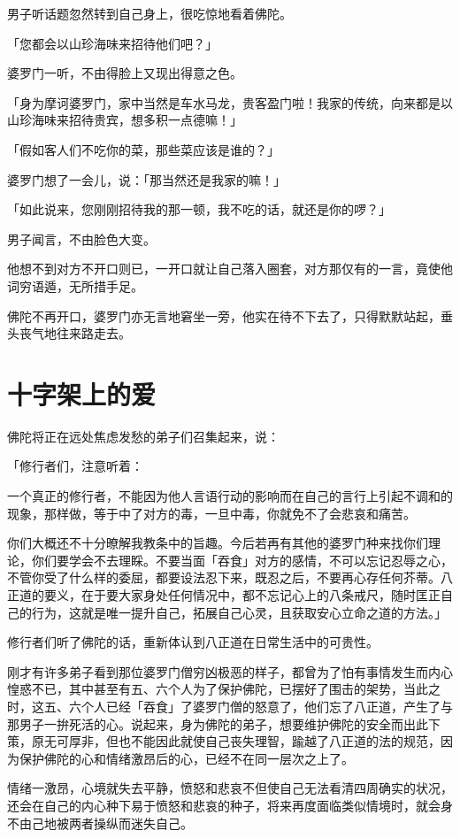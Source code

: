 \documentclass[12pt,twoside,openany]{book}
\begin{document}
男子听话题忽然转到自己身上，很吃惊地看着佛陀。

「您都会以山珍海味来招待他们吧？」

婆罗门一听，不由得脸上又现出得意之色。

「身为摩诃婆罗门，家中当然是车水马龙，贵客盈门啦！我家的传统，向来都是以山珍海味来招待贵宾，想多积一点德嘛！」

「假如客人们不吃你的菜，那些菜应该是谁的？」

婆罗门想了一会儿，说：「那当然还是我家的嘛！」

「如此说来，您刚刚招待我的那一顿，我不吃的话，就还是你的啰？」

男子闻言，不由脸色大变。

他想不到对方不开口则已，一开口就让自己落入圈套，对方那仅有的一言，竟使他词穷语遁，无所措手足。

佛陀不再开口，婆罗门亦无言地窘坐一旁，他实在待不下去了，只得默默站起，垂头丧气地往来路走去。

\section{十字架上的爱}\label{sec3.10}

佛陀将正在远处焦虑发愁的弟子们召集起来，说：

「修行者们，注意听着：

一个真正的修行者，不能因为他人言语行动的影响而在自己的言行上引起不调和的现象，那样做，等于中了对方的毒，一旦中毒，你就免不了会悲哀和痛苦。

你们大概还不十分暸解我教条中的旨趣。今后若再有其他的婆罗门种来找你们理论，你们要学会不去理睬。不要当面「吞食」对方的感情，不可以忘记忍辱之心，不管你受了什么样的委屈，都要设法忍下来，既忍之后，不要再心存任何芥蒂。八正道的要义，在于要大家身处任何情况中，都不忘记心上的八条戒尺，随时匡正自己的行为，这就是唯一提升自己，拓展自己心灵，且获取安心立命之道的方法。」

修行者们听了佛陀的话，重新体认到八正道在日常生活中的可贵性。

刚才有许多弟子看到那位婆罗门僧穷凶极恶的样子，都曾为了怕有事情发生而内心惶惑不已，其中甚至有五、六个人为了保护佛陀，已摆好了围击的架势，当此之时，这五、六个人已经「吞食」了婆罗门僧的怒意了，他们忘了八正道，产生了与那男子一拚死活的心。说起来，身为佛陀的弟子，想要维护佛陀的安全而出此下策，原无可厚非，但也不能因此就使自己丧失理智，踰越了八正道的法的规范，因为保护佛陀的心和情绪激昂后的心，已经不在同一层次之上了。

情绪一激昂，心境就失去平静，愤怒和悲哀不但使自己无法看清四周确实的状况，还会在自己的内心种下易于愤怒和悲哀的种子，将来再度面临类似情境时，就会身不由己地被两者操纵而迷失自己。
\end{document}
